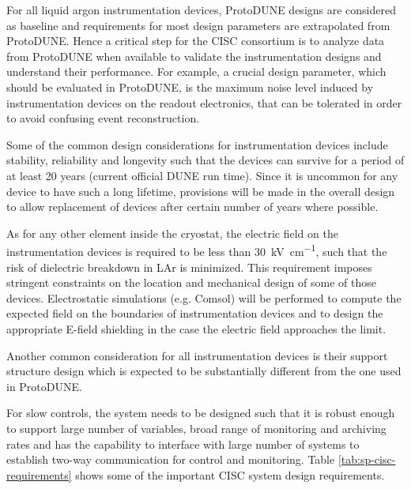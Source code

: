 
For all liquid argon instrumentation devices, ProtoDUNE designs are
considered as baseline and requirements for most design
parameters are extrapolated from ProtoDUNE. Hence a critical step for
the CISC consortium is to analyze data from ProtoDUNE when available
to validate the instrumentation designs and understand their
performance. For example, a crucial design parameter, which should be evaluated in ProtoDUNE,
is the maximum noise level induced by instrumentation devices on the readout electronics, that can be tolerated 
in order to avoid confusing event reconstruction. 

Some of the common design considerations for
instrumentation devices include stability, reliability and longevity
such that the devices can survive for a period of at least 20 years
(current official DUNE run time).  Since it is uncommon for any device
to have such a long lifetime, provisions will be made in the overall
design to allow replacement of devices after certain number of
years where possible.

As for any other element inside the cryostat, 
the electric field on the instrumentation devices is 
required to be less than \SI{30}{kV\per\cm},
such that the risk of dielectric breakdown in LAr is minimized.
This requirement imposes stringent constraints on the location and mechanical 
design of some of those devices. Electrostatic simulations (e.g. Comsol) 
will be performed to compute the expected field on the boundaries of 
instrumentation devices and to design the appropriate E-field shielding
in the case the electric field approaches the limit. 

Another common consideration for all instrumentation devices is their support structure
design which is expected to be substantially different from the one used in ProtoDUNE.

For slow controls, the system needs to be designed such that it is
robust enough to support large number of variables, broad range of
monitoring and archiving rates and has the capability to interface
with large number of systems to establish two-way communication for
control and monitoring. Table \ref{tab:sp-cisc-requirements} shows
some of the important CISC system design requirements.


